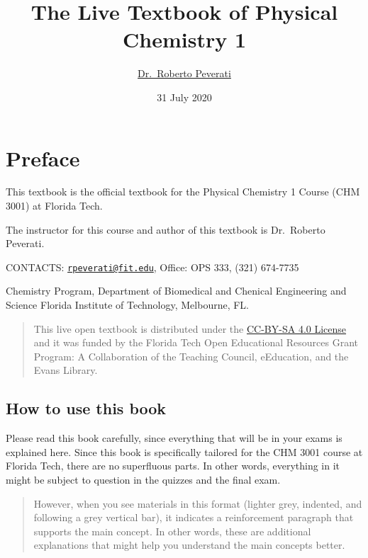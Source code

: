 \documentclass[
]{book}
\title{The Live Textbook of Physical Chemistry 1}
\author{\href{mailto:rpeverati@fit.edu}{Dr.~Roberto Peverati}}
\date{31 July 2020}
\theoremstyle{definition}
\theoremstyle{definition}
\theoremstyle{definition}
\theoremstyle{remark}
\begin{document}
\maketitle

{
\setcounter{tocdepth}{1}
\tableofcontents
}
\hypertarget{preface}{%
\chapter*{Preface}\label{preface}}

This textbook is the official textbook for the Physical Chemistry 1 Course (CHM 3001) at Florida Tech.

The instructor for this course and author of this textbook is Dr.~Roberto Peverati.

CONTACTS: \href{mailto:rpeverati@fit.edu}{\nolinkurl{rpeverati@fit.edu}}, Office: OPS 333, (321) 674-7735

Chemistry Program, Department of Biomedical and Chenical Engineering and Science
Florida Institute of Technology, Melbourne, FL.

\begin{quote}
This live open textbook is distributed under the \href{https://creativecommons.org/licenses/by-sa/4.0/}{CC-BY-SA 4.0 License} and it was funded by the Florida Tech Open Educational Resources Grant Program: A Collaboration of the Teaching Council, eEducation, and the Evans Library.
\end{quote}

\hypertarget{how-to-use-this-book}{%
\section*{How to use this book}\label{how-to-use-this-book}}

Please read this book carefully, since everything that will be in your exams is explained here.
Since this book is specifically tailored for the CHM 3001 course at Florida Tech, there are no superfluous parts. In other words, everything in it might be subject to question in the quizzes and the final exam.

\begin{quote}
However, when you see materials in this format (lighter grey, indented, and following a grey vertical bar), it indicates a reinforcement paragraph that supports the main concept. In other words, these are additional explanations that might help you understand the main concepts better.
\end{quote}
\end{document}
